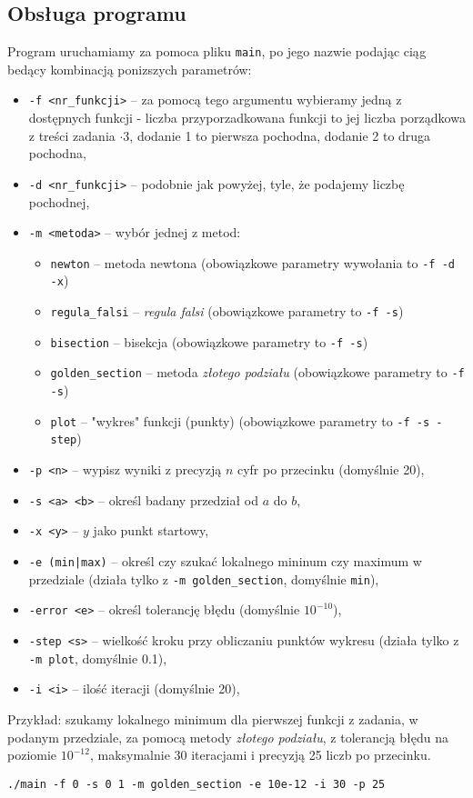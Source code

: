 \documentclass[a4paper,11pt]{article}
\begin{document}
    \subsection{Obsługa programu}
    Program uruchamiamy za pomoca pliku \texttt{main}, po jego nazwie podając ciąg bedący kombinacją ponizszych parametrów:
    \begin{itemize}
      \item \texttt{-f <nr\_funkcji>} -- za pomocą tego argumentu wybieramy jedną z dostępnych funkcji - liczba przyporzadkowana funkcji to jej liczba porządkowa z treści zadania \( \cdot 3 \), dodanie 1 to pierwsza pochodna, dodanie 2 to druga pochodna,
      \item \texttt{-d <nr\_funkcji>} -- podobnie jak powyżej, tyle, że podajemy liczbę pochodnej,
      \item \texttt{-m <metoda>} -- wybór jednej z metod:
        \begin{itemize}
          \item \texttt{newton} -- metoda newtona (obowiązkowe parametry wywołania to \texttt{-f -d -x})
          \item \texttt{regula\_falsi} -- \emph{regula falsi} (obowiązkowe parametry to \texttt{-f -s})
          \item \texttt{bisection} -- bisekcja (obowiązkowe parametry to \texttt{-f -s})
          \item \texttt{golden\_section} -- metoda \emph{złotego podziału} (obowiązkowe parametry to \texttt{-f -s})
          \item \texttt{plot} -- "wykres" funkcji (punkty) (obowiązkowe parametry to \texttt{-f -s -step})
        \end{itemize}
      \item \texttt{-p <n>} -- wypisz wyniki z precyzją $n$ cyfr po przecinku (domyślnie 20),
      \item \texttt{-s <a> <b>} -- określ badany przedział od $a$ do $b$,
      \item \texttt{-x <y>} -- $y$ jako punkt startowy,
      \item \texttt{-e (min|max)} -- określ czy szukać lokalnego mininum czy maximum w przedziale (działa tylko z \texttt{-m golden\_section}, domyślnie \texttt{min}),
      \item \texttt{-error <e>} -- określ tolerancję błędu (domyślnie $ 10^{-10} $),
      \item \texttt{-step <s>} -- wielkość kroku przy obliczaniu punktów wykresu (działa tylko z \texttt{-m plot}, domyślnie 0.1),
      \item \texttt{-i <i>} -- ilość iteracji (domyślnie 20),
      
    \end{itemize}
    
    Przykład: szukamy lokalnego minimum dla pierwszej funkcji z zadania, w podanym przedziale, za pomocą metody \emph{złotego podziału}, z tolerancją błędu na poziomie $10^{-12}$, maksymalnie 30 iteracjami i precyzją 25 liczb po przecinku.
    \begin{center}
      \texttt{./main -f 0 -s 0 1 -m golden\_section -e 10e-12 -i 30 -p 25}
    \end{center}    
\end{document}
